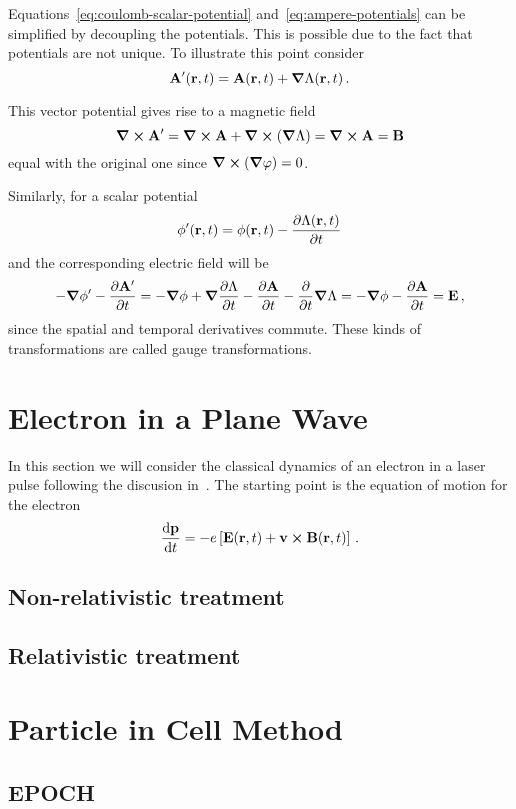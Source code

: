 \documentclass[../thesis.tex]{subfiles}
\begin{document}
Equations~\eqref{eq:coulomb-scalar-potential} and~\eqref{eq:ampere-potentials}
can be simplified by decoupling the potentials. This is possible due to the fact
that potentials are not unique. To illustrate this point consider
\[
  \vb{A}'(\vb{r},t) = \vb{A}(\vb{r},t) + \grad{\Lambda}(\vb{r},t)\,.
\]

This vector potential gives rise to a magnetic field
\[
  \curl{\vb{A}'} = \curl{\vb{A}} + \curl(\grad{\Lambda}) = \curl{\vb{A}} = \vb{B}
\]
equal with the original one since \( \curl(\grad{\varphi}) = 0 \).

Similarly, for a scalar potential
\[
  \phi'(\vb{r},t) = \phi(\vb{r},t) - \pdv{\Lambda(\vb{r},t)}{t}
\]
and the corresponding electric field will be
\[
  - \grad{\phi'} - \pdv{\vb{A'}}{t} =
  - \grad{\phi} + \grad{\pdv{\Lambda}{t}} - \pdv{\vb{A}}{t} - \pdv{t} \grad{\Lambda}
  = - \grad{\phi} - \pdv{\vb{A}}{t}
  = \vb{E}\,,
\]
since the spatial and temporal derivatives commute. These kinds of transformations
are called gauge transformations.

\section{Electron in a Plane Wave}

In this section we will consider the classical dynamics of an electron in a
laser pulse following the discusion in~\textcite{karsch_applications_2018}.
The starting point is the equation of motion for the electron
\begin{equation}
  \label{eq:lorentz-eom}
  \dv{\vb{p}}{t} = -e \left[ \vb{E}(\vb{r}, t) + \vb{v} \cp \vb{B}(\vb{r}, t) \right]\,.
\end{equation}

\subsection{Non-relativistic treatment}

\subsection{Relativistic treatment}

\section{Particle in Cell Method}

\subsection{EPOCH}
\end{document}
